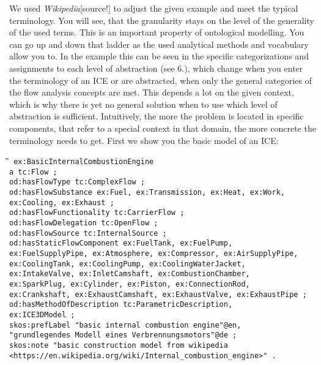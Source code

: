 \documentclass[a4paper,11pt]{article}
\newenvironment{code}{\tt \begin{tabbing}
\hskip12pt\=\hskip12pt\=\hskip12pt\=\hskip12pt\=\hskip5cm\=\hskip5cm\=\kill}
{\end{tabbing}}
\begin{document}
    We used \emph{Wikipedia}[source!] to adjust the given example and meet the
    typical terminology. You will see, that the granularity stays on the level
    of the generality of the used terms. This is an important property of 
    ontological modelling. You can go up and down that ladder as the used
    analytical methods and vocabulary allow you to. In the example this can be
    seen in the specific categorizations and assignments to each level of 
    abstraction (see 6.), which change when you enter the terminology of
    an ICE or are abstracted, when only the general categories of the 
    flow analysis concepts are met. This depends a lot on the given context,
    which is why there is yet no general solution when to use which level of 
    abstraction is sufficient. Intuitively, the more the problem is located
    in specific components, that refer to a special context in that domain,
    the more concrete the terminology needs to get.
    \newpage
    First we show you the basic model of an ICE:
    \begin{code}\tt
        ex:BasicInternalCombustionEngine \\
        \> a tc:Flow ; \\
        \> od:hasFlowType tc:ComplexFlow ; \\
        \> od:hasFlowSubstance ex:Fuel, ex:Transmission, ex:Heat, ex:Work, \\
        \> ex:Cooling, ex:Exhaust ; \\
        \> od:hasFlowFunctionality tc:CarrierFlow ; \\
        \> od:hasFlowDelegation tc:OpenFlow ; \\
        \> od:hasFlowSource tc:InternalSource ; \\
        \> od:hasStaticFlowComponent ex:FuelTank, ex:FuelPump, \\
        \> ex:FuelSupplyPipe, ex:Atmosphere, ex:Compressor, ex:AirSupplyPipe,\\
        \> ex:CoolingTank, ex:CoolingPump, ex:CoolingWaterJacket, \\
        \> ex:IntakeValve, ex:InletCamshaft, ex:CombustionChamber, \\
        \> ex:SparkPlug, ex:Cylinder, ex:Piston, ex:ConnectionRod, \\
        \> ex:Crankshaft, ex:ExhaustCamshaft, ex:ExhaustValve, 
        \> ex:ExhaustPipe ; \\
        \> od:hasMethodOfDescription tc:ParametricDescription, \\
        \> ex:ICE3DModel ; \\
        \> skos:prefLabel "basic internal combustion engine"@en, \\
        \> "grundlegendes Modell eines Verbrennungsmotors"@de  ; \\
        \> skos:note "basic construction model from wikipedia \\
        \> <https://en.wikipedia.org/wiki/Internal\_combustion\_engine>" . \\
    \end{code}
\end{document}
